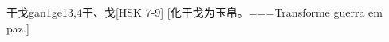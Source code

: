 \begin{EntryWithPhonetic}{干戈}{gan1ge1}{3,4}{⼲、⼽}[HSK 7-9]
  [化干戈为玉帛。===Transforme guerra em paz.]
\end{EntryWithPhonetic}
